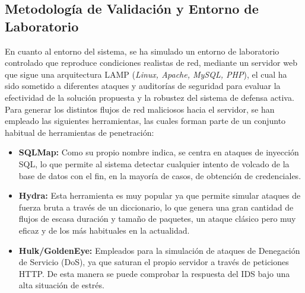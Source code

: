 \documentclass[12pt]{article}
\numberwithin{equation}{section} %
\begin{document}
    \vspace{10mm}





    \subsection{Metodología de Validación y Entorno de Laboratorio}

    \vspace{5mm}

    En cuanto al entorno del sistema, se ha simulado un entorno de laboratorio controlado que reproduce condiciones realistas de red, mediante un servidor web que sigue una arquitectura LAMP (\textit{Linux, Apache, MySQL, PHP}), el cual ha sido sometido a diferentes ataques y auditorías de seguridad para evaluar la efectividad de la solución propuesta y la robustez del sistema de defensa activa. Para generar los distintos flujos de red maliciosos hacia el servidor, se han empleado las siguientes herramientas, las cuales forman parte de un conjunto habitual de herramientas de penetración:

    \vspace{5mm}

    \begin{itemize}
        \item \textbf{SQLMap:} Como su propio nombre indica, se centra en ataques de inyección SQL, lo que permite al sistema detectar cualquier intento de volcado de la base de datos con el fin, en la mayoría de casos, de obtención de credenciales.
        
        \vspace{5mm}

        \item \textbf{Hydra:} Esta herramienta es muy popular ya que permite simular ataques de fuerza bruta a través de un diccionario, lo que genera una gran cantidad de flujos de escasa duración y tamaño de paquetes, un ataque clásico pero muy eficaz y de los más habituales en la actualidad.
        
        \vspace{5mm}

        \item \textbf{Hulk/GoldenEye:} Empleados para la simulación de ataques de Denegación de Servicio (DoS), ya que saturan el propio servidor a través de peticiones HTTP. De esta manera se puede comprobar la respuesta del IDS bajo una alta situación de estrés.
    \end{itemize}
\end{document}
